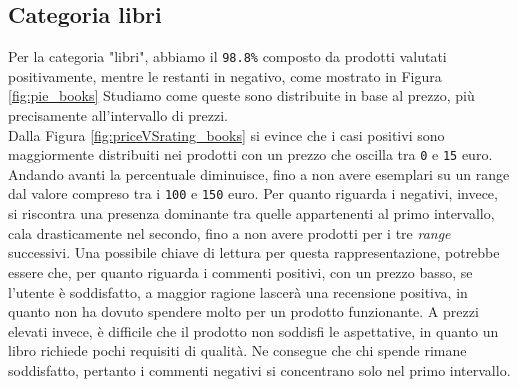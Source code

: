 			\subsection{Categoria libri}
				Per la categoria "libri", abbiamo il \verb|98.8%| composto da prodotti valutati positivamente, mentre le restanti in negativo, come mostrato in Figura \ref{fig:pie_books}
				Studiamo come queste sono distribuite in base al prezzo, più precisamente all'intervallo di prezzi. \\
				Dalla Figura \ref{fig:priceVSrating_books} si evince che i casi positivi sono maggiormente distribuiti nei prodotti con un prezzo che oscilla tra \verb|0| e \verb|15| euro. Andando avanti la percentuale diminuisce, fino a non avere esemplari su un range dal valore compreso tra i \verb|100| e \verb|150| euro. Per quanto riguarda i negativi, invece, si riscontra una presenza dominante tra quelle appartenenti al primo intervallo, cala drasticamente nel secondo, fino a non avere prodotti per i tre \textit{range} successivi. Una possibile chiave di lettura per questa rappresentazione, potrebbe essere che, per quanto riguarda i commenti positivi, con un prezzo basso, se l'utente è soddisfatto, a maggior ragione lascerà una recensione positiva, in quanto non ha dovuto spendere molto per un prodotto funzionante. A prezzi elevati invece, è difficile che il prodotto non soddisfi le aspettative, in quanto un libro richiede pochi requisiti di qualità. Ne consegue che chi spende rimane soddisfatto, pertanto i commenti negativi si concentrano solo nel primo intervallo.
					
